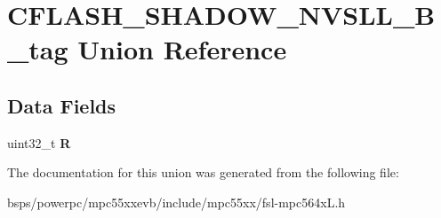 \hypertarget{unionCFLASH__SHADOW__NVSLL__32B__tag}{}\section{C\+F\+L\+A\+S\+H\+\_\+\+S\+H\+A\+D\+O\+W\+\_\+\+N\+V\+S\+L\+L\+\_\+B\+\_\+tag Union Reference}
\label{unionCFLASH__SHADOW__NVSLL__32B__tag}
\subsection*{Data Fields}
\begin{DoxyCompactItemize}
\item 
\mbox{\label{unionCFLASH__SHADOW__NVSLL__32B__tag_a96ea41ba85ff4ff2743ec3c1d2d3957f}} 
uint32\+\_\+t {\bfseries R}
\end{DoxyCompactItemize}


The documentation for this union was generated from the following file\+:\begin{DoxyCompactItemize}
\item 
bsps/powerpc/mpc55xxevb/include/mpc55xx/fsl-\/mpc564x\+L.\+h\end{DoxyCompactItemize}
